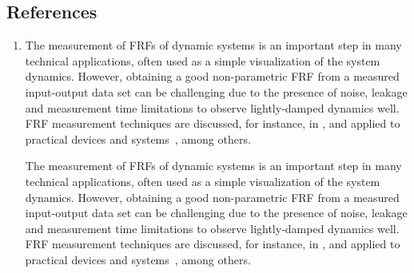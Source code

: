 \documentclass{responseletter}
\begin{document}
\subsection{References}
\begin{enumerate}
\item 
{}
\begin{oldquote}
The measurement of \glspl{FRF} of dynamic systems is an important step in many technical applications, often used as a simple visualization of the system dynamics.
However, obtaining a good non-parametric \gls{FRF} from a measured input-output data set can be challenging due to the presence of noise, leakage and measurement time limitations to observe lightly-damped dynamics well.
\gls{FRF} measurement techniques are discussed, for instance, in
\citep{Schoukens1998,Schoukens2006LPM,Guillaume1996,Broersen1995,Pintelon2010LPM1,Antoni2007FRF,Pintelon2012}, and applied to practical devices and systems~\citep{Lim2010,Robinson1990,Behjat2010}, among others.
\end{oldquote}
\begin{newquote}
The measurement of \glspl{FRF} of dynamic systems is an important step in many technical applications, often used as a simple visualization of the system dynamics.
However, obtaining a good non-parametric \gls{FRF} from a measured input-output data set can be challenging due to the presence of noise, leakage and measurement time limitations to observe lightly-damped dynamics well.
\gls{FRF} measurement techniques are discussed, for instance, in
\citep{Schoukens1998,Schoukens2006LPM,Guillaume1996,Broersen1995,Pintelon2010LPM1,Antoni2007FRF,Pintelon2012,Bendat2010,Bendat1993,Jenkins1968,Box2008,Bendat1978,Blackman1959}, and applied to practical devices and systems~\citep{Lim2010,Robinson1990,Behjat2010,White1969}, among others.
\end{newquote}


\end{enumerate}
\end{document}
